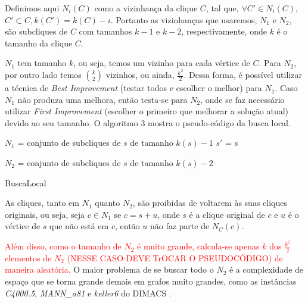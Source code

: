 \documentclass{article}
\begin{document}
Definimos aqui $N_i(C)$ como a vizinhança da clique $C$, tal que, $\forall C' \in N_i(C), $\\$C' \subset C,  k(C') = k(C)-i$. Portanto as vizinhanças que usaremos, $N_1$ e $N_2$, são subcliques de $C$ com tamanhos $k-1$ e $k-2$, respectivamente, onde $k$ é o tamanho da clique $C$.\par

$N_1$ tem tamanho $k$, ou seja, temos um vizinho para cada vértice de $C$. Para $N_2$, por outro lado temos $\binom{k}{2}$  vizinhos, ou ainda, $\frac{k^2}{2}$. Dessa forma, é possível utilizar a técnica de \textit{Best Improvement} (testar todos e escolher o melhor) para $N_1$. Caso $N_1$ não produza uma melhora, então testa-se para $N_2$, onde se faz necessário utilizar \textit{First Improvement} (escolher o primeiro que melhorar a solução atual) devido ao seu tamanho. O algoritmo 3 mostra o pseudo-código da busca local.\par

\begin{algorithm}
 $N_1$ = conjunto de subcliques de $s$ de tamanho $k(s)-1$\;
 $s'$ = s\;
 


 $N_2$ = conjunto de subcliques de $s$ de tamanho $k(s)-2$\;


 \caption{BuscaLocal}
\end{algorithm}

As cliques, tanto em $N_1$ quanto $N_2$, são proibidas de voltarem às suas cliques originais, ou seja, seja $c \in N_1$ se $c = s + u$, onde $s$ é a clique original de $c$ e $u$ é o vértice de $s$ que não está em $c$, então $u$ não faz parte de $N_C(c)$.\par

\textcolor{red}{Além disso, como o tamanho de $N_2$ é muito grande, calcula-se apenas $k$ dos $\frac{k^2}{2}$ elementos de $N_2$ (NESSE CASO DEVE TrOCAR O PSEUDOCÓDIGO) de maneira aleatória.} O maior problema de se buscar todo o $N_2$ é a complexidade de espaço que se torna grande demais em grafos muito grandes, como as instâncias \textit{C4000.5}, \textit{MANN\_a81} e \textit{keller6} do DIMACS \cite{DIMACS2}.\par
\end{document}
